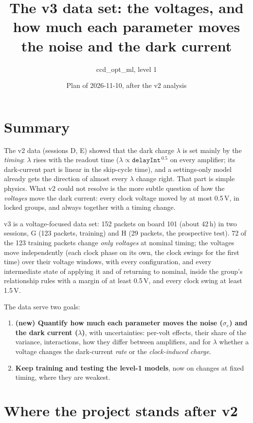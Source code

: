 \documentclass[11pt]{article}
\title{The v3 data set: the voltages, and how much each parameter moves the noise and the dark current}
\author{ccd\_opt\_ml, level 1}
\date{Plan of 2026-11-10, after the v2 analysis}
\begin{document}
\maketitle

\section*{Summary}
The v2 data (sessions D, E) showed that the dark charge $\lambda$ is set mainly by the \emph{timing}: $\lambda$ rises with
the readout time ($\lambda \propto \texttt{delayInt}^{\,0.5}$ on every amplifier; its dark-current part is linear in the
skip-cycle time), and a settings-only model already gets the direction of almost every $\lambda$ change right. That part
is simple physics. What v2 could not resolve is the more subtle question of how the \emph{voltages} move the dark current:
every clock voltage moved by at most 0.5\,V, in locked groups, and always together with a timing change.

v3 is a voltage-focused data set: 152 packets on board 101 (about 42\,h) in two sessions, G (123 packets, training) and
H (29 packets, the prospective test). 72 of the 123 training packets change \emph{only voltages} at nominal timing; the
voltages move independently (each clock phase on its own, the clock swings for the first time) over their voltage
windows, with every configuration, and every intermediate state of applying it and of returning to nominal, inside the
group's relationship rules with a margin of at least 0.5\,V, and every clock swing at least 1.5\,V.

The data serve two goals:
\begin{enumerate}
\item \textbf{(new) Quantify how much each parameter moves the noise ($\sigma_e$) and the dark current ($\lambda$)}, with
  uncertainties: per-volt effects, their share of the variance, interactions, how they differ between amplifiers, and
  for $\lambda$ whether a voltage changes the dark-current \emph{rate} or the \emph{clock-induced charge}.
\item \textbf{Keep training and testing the level-1 models}, now on changes at fixed timing, where they are weakest.
\end{enumerate}

\section{Where the project stands after v2}
\end{document}
